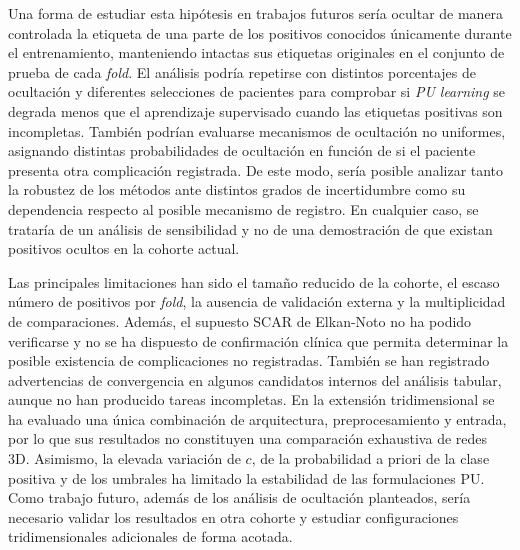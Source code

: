 Una forma de estudiar esta hipótesis en trabajos futuros sería ocultar de manera controlada la etiqueta de una parte de los positivos conocidos únicamente durante el entrenamiento, manteniendo intactas sus etiquetas originales en el conjunto de prueba de cada \textit{fold}. El análisis podría repetirse con distintos porcentajes de ocultación y diferentes selecciones de pacientes para comprobar si \textit{PU learning} se degrada menos que el aprendizaje supervisado cuando las etiquetas positivas son incompletas. También podrían evaluarse mecanismos de ocultación no uniformes, asignando distintas probabilidades de ocultación en función de si el paciente presenta otra complicación registrada. De este modo, sería posible analizar tanto la robustez de los métodos ante distintos grados de incertidumbre como su dependencia respecto al posible mecanismo de registro. En cualquier caso, se trataría de un análisis de sensibilidad y no de una demostración de que existan positivos ocultos en la cohorte actual.

Las principales limitaciones han sido el tamaño reducido de la cohorte, el escaso número de positivos por \textit{fold}, la ausencia de validación externa y la multiplicidad de comparaciones. Además, el supuesto SCAR de Elkan-Noto no ha podido verificarse y no se ha dispuesto de confirmación clínica que permita determinar la posible existencia de complicaciones no registradas. También se han registrado advertencias de convergencia en algunos candidatos internos del análisis tabular, aunque no han producido tareas incompletas. En la extensión tridimensional se ha evaluado una única combinación de arquitectura, preprocesamiento y entrada, por lo que sus resultados no constituyen una comparación exhaustiva de redes 3D. Asimismo, la elevada variación de \(c\), de la probabilidad a priori de la clase positiva y de los umbrales ha limitado la estabilidad de las formulaciones PU. Como trabajo futuro, además de los análisis de ocultación planteados, sería necesario validar los resultados en otra cohorte y estudiar configuraciones tridimensionales adicionales de forma acotada.
